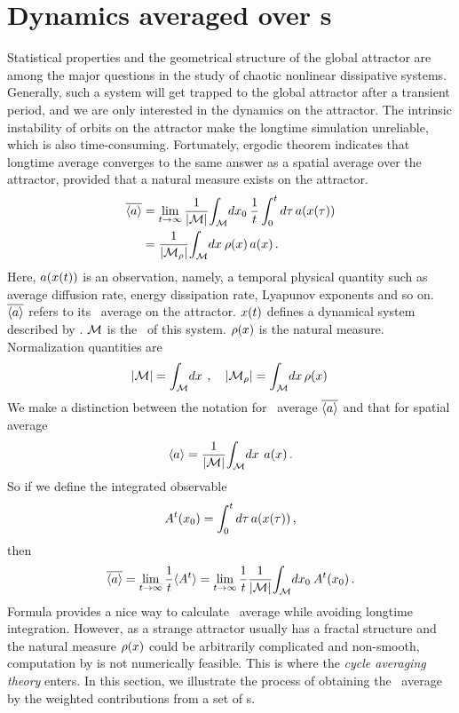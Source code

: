 \section{Dynamics averaged over \po s}
\label{sect:cycExp}

Statistical properties and the geometrical structure of the global attractor
are among the major
questions in the study of chaotic nonlinear dissipative systems.
Generally,
such a system will get trapped to the global attractor after a transient
period, and we are only interested
in the dynamics on the attractor. The intrinsic instability of
orbits on the attractor make the longtime simulation unreliable, which is
also time-consuming. Fortunately, ergodic theorem indicates that
longtime average converges to the same answer as a spatial average over the attractor,
provided that a natural measure exists on the attractor.
\begin{align}
  \overline{\langle {a} \rangle}
  & = \lim_{t\to \infty} {1\over |\mathcal{M}|}
  {\int_{\mathcal{M}}{\!d x_0}\:}
  {1\over t} \int_0^t d\tau \,
  a(x(\tau)) \label{eq:spa_ave1}\\
  & =  {1\over |\mathcal{M}_{\rho}|}
  {\int_{\mathcal{M}}{\!d x}\:} \rho(x) \, a(x) \,. \label{eq:spa_ave2}
\end{align}
Here, $a(x(t))$ is an observation, namely, a temporal
physical quantity such as average diffusion rate, energy dissipation rate,
Lyapunov exponents and so on. $\overline{\langle {a} \rangle}$ refers to its \spt\ average
on the attractor.
$x(t)$ defines a dynamical system described by .
$\mathcal{M}$ is the \statesp\ of this system.
$\rho(x)$ is the natural measure. Normalization quantities are
\begin{equation}
  \label{eq:ave_norm}
  |\mathcal{M}| = {\int_{\mathcal{M}}{\!d x}\:} \,,\quad
  |\mathcal{M}_{\rho}| = {\int_{\mathcal{M}}{\!d x\,\rho(x)}\:}
\end{equation}
We make a distinction between the notation for \spt\ average
$\overline{\langle {a} \rangle}$ and that for spatial average
\[
  \langle {a} \rangle = {1\over |\mathcal{M}|}  {\int_{\mathcal{M}}{\!d x}\:} \, a(x)
  \,.
\]
So if
we define the integrated observable
\begin{equation}
  \label{eq:ave}
  A^t(x_0) =
  \int_0^t d\tau \, a(x(\tau))
  \,,
\end{equation}
then
\begin{equation}
  \label{eq:ave2}
  \overline{\langle {a} \rangle} = \lim_{t\to\infty} \frac{1}{t} \langle {A^t} \rangle
  = \lim_{t\to\infty} \frac{1}{t} {1\over |\mathcal{M}|}
  {\int_{\mathcal{M}}{\!d x_0}\:} A^t(x_0)
  \,.
\end{equation}
Formula  provides a nice way to calculate \spt\
average while avoiding longtime integration.
However, as a strange attractor usually has a fractal structure
and the natural measure $\rho(x)$ could be arbitrarily complicated
and non-smooth,
computation by 
is not numerically feasible. This is where the
\emph{cycle averaging theory} enters.
In this section, we illustrate the process of obtaining the \spt\
average  by the weighted contributions from a set of \po s.


